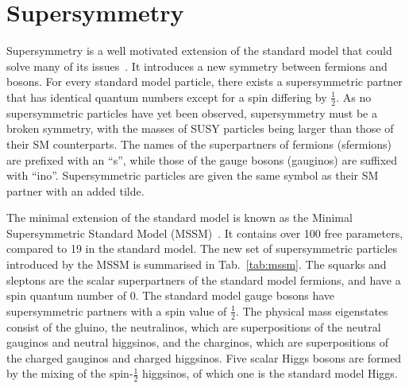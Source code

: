 \section{Supersymmetry}
\label{sec:theory-susy}
Supersymmetry is a well motivated extension of the standard model that 
could solve many of its issues~\cite{susy-primer}. It introduces a new symmetry 
between fermions 
and bosons. For every standard model particle, there exists a supersymmetric 
partner that has identical quantum numbers except for a spin differing by 
$\frac{1}{2}$. As no supersymmetric particles have yet been observed, 
supersymmetry must be a broken symmetry, with the masses of SUSY particles 
being larger than those of their SM counterparts. The names of the 
superpartners of fermions (sfermions) are prefixed with an ``s'', while those 
of the gauge bosons (gauginos) are suffixed with ``ino''. Supersymmetric 
particles are given the same symbol as their SM partner with an added tilde.

The minimal extension of the standard model is known as the Minimal 
Supersymmetric Standard Model (MSSM)~\cite{mssm}. It contains over 100 free 
parameters, compared to 19 in the standard model.
The new set of supersymmetric particles introduced by the MSSM is summarised in 
Tab.~\ref{tab:mssm}. The squarks and sleptons are the scalar superpartners of 
the standard model fermions, and have a spin quantum number of 0. The standard 
model gauge bosons have supersymmetric partners with a spin value of 
$\frac{1}{2}$. The physical mass eigenstates consist of the gluino, the 
neutralinos, which are superpositions of the neutral gauginos and neutral 
higgsinos, and the charginos, which are superpositions of the charged gauginos 
and charged higgsinos. Five scalar Higgs bosons are formed by the mixing of the 
{spin-$\frac{1}{2}$} higgsinos, of which one is the standard model Higgs.

